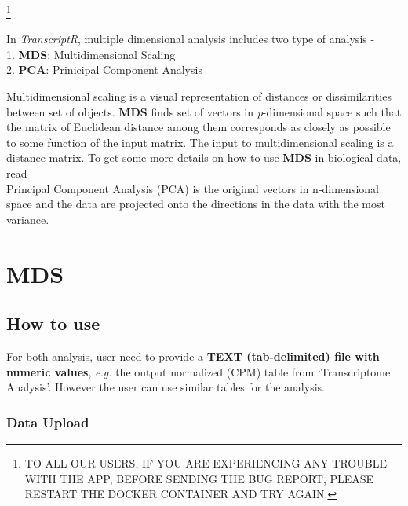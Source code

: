 \documentclass[
  a4paper,
  oneside,
  open=any]{scrreport}
\begin{document}
\footnote{TO ALL OUR USERS, IF YOU ARE EXPERIENCING ANY TROUBLE WITH THE
  APP, BEFORE SENDING THE BUG REPORT, PLEASE RESTART THE DOCKER
  CONTAINER AND TRY AGAIN.}

In \emph{TranscriptR}, multiple dimensional analysis includes two type
of analysis -\\
1. \textbf{MDS}: Multidimensional Scaling\\
2. \textbf{PCA}: Prinicipal Component Analysis

Multidimensional scaling is a visual representation of distances or
dissimilarities between set of objects. \textbf{MDS} finds set of
vectors in \emph{p}-dimensional space such that the matrix of Euclidean
distance among them corresponds as closely as possible to some function
of the input matrix. The input to multidimensional scaling is a distance
matrix. To get some more details on how to use \textbf{MDS} in
biological data, read
\autocite{mugavin2008multidimensional,lacher1987interpretation,lacher1988comparison}\\
Principal Component Analysis (PCA) is the original vectors in
n-dimensional space and the data are projected onto the directions in
the data with the most variance.

\hypertarget{mds}{%
\section{MDS}\label{mds}}

\hypertarget{how-to-use-2}{%
\subsection{How to use}\label{how-to-use-2}}

For both analysis, user need to provide a \textbf{TEXT (tab-delimited)
file with numeric values}, \emph{e.g.} the output normalized (CPM) table
from `Transcriptome Analysis'. However the user can use similar tables
for the analysis.

\hypertarget{data-upload-1}{%
\subsubsection{Data Upload}\label{data-upload-1}}
\end{document}
